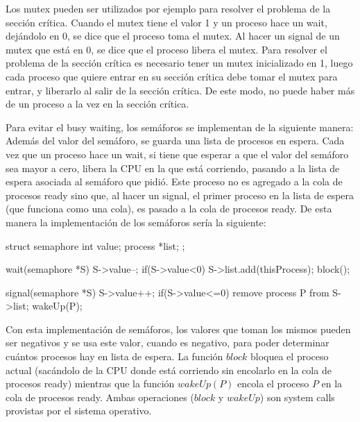 \documentclass{article}
\begin{document}
Los mutex pueden ser utilizados por ejemplo para resolver el problema de la secci\'on cr\'itica. Cuando el mutex tiene el valor 1 y un proceso hace un wait, dej\'andolo en 0, se dice que el proceso toma el mutex. Al hacer un signal de un mutex que est\'a en 0, se dice que el proceso libera el mutex. Para resolver el problema de la secci\'on cr\'itica es necesario tener un mutex inicializado en 1, luego cada proceso que quiere entrar en su secci\'on cr\'itica debe tomar el mutex para entrar, y liberarlo al salir de la secci\'on cr\'itica. De este modo, no puede haber m\'as de un proceso a la vez en la secci\'on cr\'itica.

Para evitar el busy waiting, los sem\'aforos se implementan de la siguiente manera: Adem\'as del valor del sem\'aforo, se guarda una lista de procesos en espera. Cada vez que un proceso hace un wait, si tiene que esperar a que el valor del sem\'aforo sea mayor a cero, libera la CPU en la que est\'a corriendo, pasando a la lista de espera asociada al sem\'aforo que pidi\'o. Este proceso no es agregado a la cola de procesos ready sino que, al hacer un signal, el primer proceso en la lista de espera (que funciona como una cola), es pasado a la cola de procesos ready. De esta manera la implementaci\'on de los sem\'aforos ser\'ia la siguiente:

\begin{code}
struct semaphore{
    int value;
		process *list;
};
\end{code}

\begin{code}
wait(semaphore *S)
{
    S->value--;
		if(S->value<0)
		{
		    S->list.add(thisProcess);
				block();
		}
}
\end{code}

\begin{code}
signal(semaphore *S)
{
    S->value++;
		if(S->value<=0)
		{
		    remove process P from S->list;
				wakeUp(P);
		}
}
\end{code}

Con esta implementaci\'on de sem\'aforos, los valores que toman los mismos pueden ser negativos y se usa este valor, cuando es negativo, para poder determinar cu\'antos procesos hay en lista de espera. La funci\'on $block$ bloquea el proceso actual (sac\'andolo de la CPU donde est\'a corriendo sin encolarlo en la cola de procesos ready) mientras que la funci\'on $wakeUp(P)$ encola el proceso $P$ en la cola de procesos ready. Ambas operaciones ($block$ y $wakeUp$) son system calls provistas por el sistema operativo.
\end{document}

